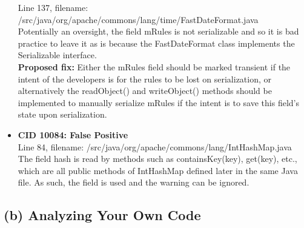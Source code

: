 \documentclass{article}
\begin{document}
\begin{itemize}
    Line 137, filename: /src/java/org/apache/commons/lang/time/FastDateFormat.java \\
    Potentially an oversight, the field mRules is not serializable and so it is bad practice to leave it 
    as is because the FastDateFormat class implements the Serializable interface. \\
    \textbf{Proposed fix:} Either the mRules field should be marked transient if the intent of the developers 
    is for the rules to be lost on serialization, or alternatively the readObject() and writeObject() methods 
    should be implemented to manually serialize mRules if the intent is to save this field's state upon serialization.
\item \textbf{CID 10084: False Positive} \\
    Line 84, filename: /src/java/org/apache/commons/lang/IntHashMap.java \\
    The field hash is read by methods such as containsKey(key), get(key), etc., which are all public methods of
    IntHashMap defined later in the same Java file. As such, the field is used and the warning can be ignored.
\end{itemize}

\subsection*{(b) Analyzing Your Own Code}
\end{document}
